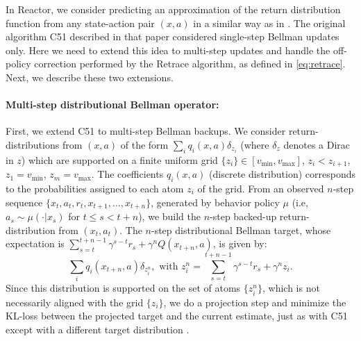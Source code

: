 \documentclass{article}
\begin{document}
In Reactor, we consider predicting an 
approximation of the return distribution function from any state-action pair 
$(x,a)$ in a similar way as in \citet{bellemare2017distributional}. The 
original 
algorithm C51 described in that paper considered single-step Bellman updates 
only. Here we need to extend this idea to multi-step updates 
and handle the off-policy correction performed by the Retrace algorithm, as 
defined in
\eqref{eq:retrace}. Next, we describe these two extensions.

\paragraph{Multi-step distributional Bellman operator:} First, we extend C51 to 
multi-step Bellman backups. We consider return-distributions from $(x,a)$ of the form 
$\sum_{i} q_i(x,a) \delta_{z_i}$ (where $\delta_z$ denotes a Dirac in $z$) 
which are supported on a finite uniform grid $\{z_i\}\in [v_{\min}, 
v_{\max}]$, $z_i < z_{i+1}$, $z_{1} = v_{\min}$, $z_{m} = v_{\max}$. 
The coefficients $q_i(x,a)$ (discrete distribution) corresponds to the 
probabilities assigned to each atom 
$z_i$ of the grid. From an observed $n$-step sequence $\{x_t,a_t, r_t, x_{t+1}, 
\dots, x_{t+n}\}$, generated by behavior policy $\mu$ 
(i.e, $a_s\sim\mu(\cdot|x_s)$ for $t \leq s<t+n$), we build the 
$n$-step backed-up return-distribution from $(x_t, a_t)$. The $n$-step distributional 
Bellman target, whose expectation is $\sum_{s=t}^{t+n-1} \gamma^{s-t} r_s + \gamma^n Q(x_{t+n},a)$, 
is given by:
$$\sum_{i} q_i(x_{t+n},a) \delta_{z_i^{n}}, \mbox{ with } z^{n}_i = 
\sum_{s=t}^{t+n-1}\gamma^{s-t} r_s + \gamma^n z_i.$$
Since this distribution is supported on the set of atoms $\{z^{n}_i\}$, which is 
not necessarily aligned with the grid 
$\{z_i\}$, we do a projection step and minimize the KL-loss between the projected 
target and the current estimate, just as with C51 except with a different target distribution \citep{bellemare2017distributional}.
\end{document}
